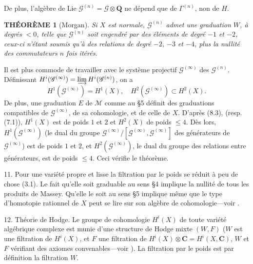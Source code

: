 \documentclass{amsart}
\theoremstyle{plain}
\newtheorem{theorem}{TH\'EOR\`EME}
\theoremstyle{definition}
\theoremstyle{remark}
\begin{document}
De plus, l'alg\`ebre de Lie $\mathscr{G}^{(n)} = \mathscr{G} \otimes \mathbf{Q}$ ne d\'epend que de $\Gamma^{(n)}$, non de $H$.

\begin{theorem}[Morgan]
Si $X$ est normale, $\mathscr{G}^{(n)}$ admet une graduation $W$, \`a degr\'es $< 0$, telle que $\mathscr{G}^{(n)}$ soit engendr\'e par des \'el\'ements de degr\'e $-1$ et $-2$, ceux-ci n'\'etant soumis qu'\`a des relations de degr\'e $-2$, $-3$ et $-4$, plus la nullit\'e des commutateurs $n$ fois it\'er\'es.
\end{theorem}

Il est plus commode de travailler avec le syst\`eme projectif $\mathscr{G}^{(\infty)}$ des $\mathscr{G}^{(n)}$. D\'efinissant $H^i(\mathscr{G}^{(\infty)}) = \varinjlim H^i(\mathscr{G}^{(n)})$, on a
\[
H^1(\mathscr{G}^{(\infty)}) = H^1(X), \quad H^2(\mathscr{G}^{(\infty)}) \subset H^2(X).
\]
De plus, une graduation $E$ de $\mathscr{M}$ comme au \S 5 d\'efinit des graduations compatibles de $\mathscr{G}^{(\infty)}$, de sa cohomologie, et de celle de $X$. D'apr\`es (8.3), (resp. (7.1)), $H^1(X)$ est de poids $1$ et $2$ et $H^2(X)$ de poids $\leq 4$. D\`es lors, $H^1(\mathscr{G}^{(\infty)})$ (le dual du groupe $\mathscr{G}^{(\infty)}/[\mathscr{G}^{(\infty)}, \mathscr{G}^{(\infty)}]$ des g\'en\'erateurs de $\mathscr{G}^{(\infty)}$) est de poids $1$ et $2$, et $H^2(\mathscr{G}^{(\infty)})$, le dual du groupe des relations entre g\'en\'erateurs, est de poids $\leq 4$. Ceci v\'erifie le th\'eor\`eme.

11. Pour une vari\'et\'e propre et lisse la filtration par le poids se r\'eduit \`a peu de chose (3.1). Le fait qu'elle soit graduable au sens \S 4 implique la nullit\'e de tous les produits de Massey. Qu'elle le soit au sens \S 5 implique m\^eme que le type d'homotopie rationnel de $X$ peut se lire sur son alg\`ebre de cohomologie---voir \cite{DGMS}.

12. Th\'eorie de Hodge. Le groupe de cohomologie $H^i(X)$ de toute vari\'et\'e alg\'ebrique complexe est munie d'une structure de Hodge mixte $(W, F)$ ($W$ est une filtration de $H^i(X)$, et $F$ une filtration de $H^i(X) \otimes \mathbf{C} = H^i(X, \mathbf{C})$, $W$ et $F$ v\'erifiant des axiomes convenables---voir \cite{D1}). La filtration par le poids est par d\'efinition la filtration $W$.
\end{document}
